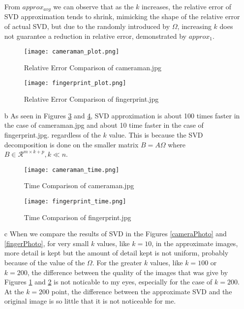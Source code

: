 \documentclass[10pt,a4paper, margin=1in]{article}
\begin{document}
\begin{enumerate}
    	From $approx_{avg}$ we can observe that as the $k$ increases, the relative error of SVD approximation tends to shrink, mimicking the shape of the relative error of actual SVD, but  due to the randomly introduced by $\Omega$, increasing $k$ does not guarantee a reduction in relative error, demonstrated by $approx_1$. 
    	\begin{figure}[h]
    		\centering
    		\texttt{[image: cameraman\_plot.png]}
    		\caption{Relative Error Comparison of cameraman.jpg}
  			\label{cameraRelError}
		\end{figure}
		\begin{figure}[h]
			\centering
			\texttt{[image: fingerprint\_plot.png]}
			\caption{Relative Error Comparison of fingerprint.jpg}
  			\label{fingerRelError}
		\end{figure}
    \item[b]
    	As seen in Figures \ref{cameraTime} and \ref{fingerTime}, SVD approximation is about 100 times faster in the case of cameraman.jpg and about 10 time faster in the case of fingerprint.jpg. regardless of the $k$ value. This is because the SVD decomposition is done on the smaller matrix $B = A\Omega$ where $B\in \mathcal{R}^{m \times k+p}, k\ll n$. 
    	\begin{figure}[h]
    		\centering
    		\texttt{[image: cameraman\_time.png]}
    		\caption{Time Comparison of cameraman.jpg}
  			\label{cameraTime}
		\end{figure}
		\begin{figure}[h]
			\centering
			\texttt{[image: fingerprint\_time.png]}
			\caption{Time Comparison of fingerprint.jpg}
  			\label{fingerTime}
		\end{figure}
    \item[c]
    	When we compare the results of SVD in the Figures \ref{cameraPhoto} and \ref{fingerPhoto}, for very small $k$ values, like $k=10$, in the approximate images, more detail is kept but the amount of detail kept is not uniform, probably because of the value of the $\Omega$. For the greater $k$ values, like $k = 100$ or $k = 200$, the difference between the quality of the images that was give by Figures \ref{cameraRelError} and \ref{fingerRelError} is not noticable to my eyes, especially for the case of $k=200$. At the $k=200$ point, the difference between the approximate SVD and the original image is so little that it is not noticeable for me.
    	\begin{figure}[h]

\end{figure}
\end{enumerate}
\end{document}
